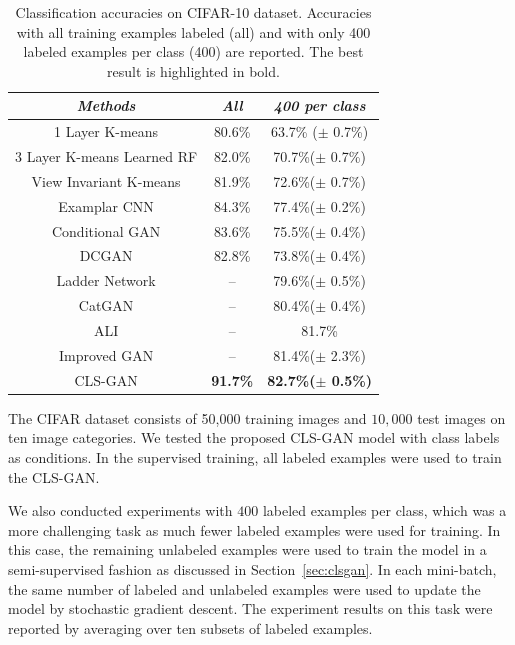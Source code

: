 \begin{table}[]
\caption{Classification accuracies on CIFAR-10 dataset. Accuracies with all training examples labeled (all) and with only 400 labeled examples per class (400) are reported. The best result is highlighted in bold.
}
\label{tab:cifar10}
\begin{center}
\begin{tabular}{c||c|c}    \toprule
\emph{Methods} & \emph{All}& \emph{400 per class}   \\\midrule
1 Layer K-means \cite{radford2015unsupervised}& 80.6\% & 63.7\% ($\pm$ 0.7\%) \\
3 Layer K-means Learned RF \cite{coates2011selecting}& 82.0\% & 70.7\%($\pm$ 0.7\%)  \\
View Invariant K-means \cite{hui2013direct}& 81.9\% & 72.6\%($\pm$ 0.7\%) \\
Examplar CNN \cite{dosovitskiydiscriminative}& 84.3\% & 77.4\%($\pm$ 0.2\%) \\
Conditional GAN \cite{mirza2014conditional} & 83.6\% & 75.5\%($\pm$ 0.4\%)\\
DCGAN \cite{radford2015unsupervised}& 82.8\% & 73.8\%($\pm$ 0.4\%) \\
Ladder Network \cite{rasmus2015semi} &  -- & 79.6\%($\pm$ 0.5\%)\\
CatGAN \cite{springenberg2015unsupervised} & -- & 80.4\%($\pm$ 0.4\%) \\
ALI \cite{dumoulin2016adversarially} & -- & 81.7\%\\
Improved GAN \cite{salimans2016improved} & -- & 81.4\%($\pm$ 2.3\%) \\\midrule
CLS-GAN & \bf 91.7\% & \bf 82.7\%($\pm$ 0.5\%) \\\bottomrule
\end{tabular}
\end{center}
\end{table}

The CIFAR dataset \cite{krizhevsky2009learning} consists of 50,000 training images and $10,000$ test images on ten image categories.
We tested the proposed CLS-GAN model with class labels as conditions.  In the supervised training, all labeled examples were used to train the CLS-GAN.


We also conducted experiments with $400$ labeled examples per class, which was a more challenging task as much fewer labeled examples were used for training. In this case, the remaining unlabeled examples were used to train the model in a semi-supervised fashion as discussed in Section~\ref{sec:clsgan}. In each mini-batch, the same number of labeled and unlabeled examples were used to update the model by stochastic gradient descent. The experiment results on this task were reported by averaging over ten subsets of labeled examples.

